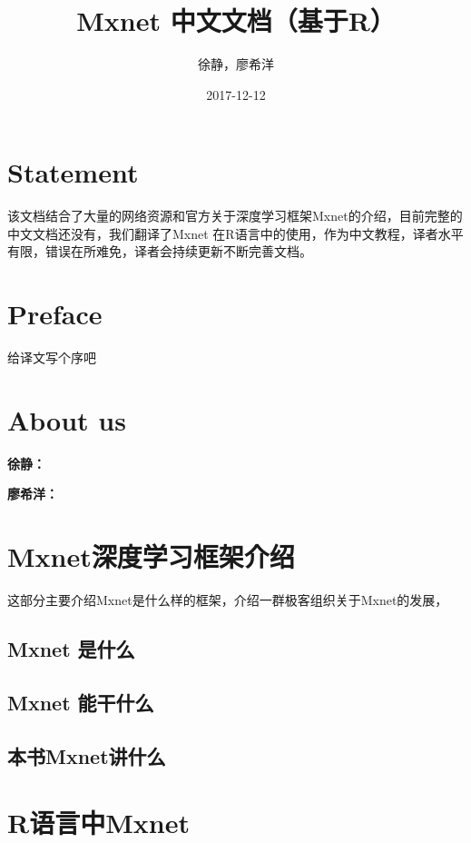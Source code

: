 \documentclass[]{book}
\title{Mxnet 中文文档（基于R）}
\author{徐静，廖希洋}
\date{2017-12-12}
\begin{document}
\maketitle

{
\setcounter{tocdepth}{1}
\tableofcontents
}
\chapter*{Statement}\label{statement}

该文档结合了大量的网络资源和官方关于深度学习框架Mxnet的介绍，目前完整的中文文档还没有，我们翻译了Mxnet
在R语言中的使用，作为中文教程，译者水平有限，错误在所难免，译者会持续更新不断完善文档。

\chapter*{Preface}\label{preface}

给译文写个序吧

\chapter*{About us}\label{about-us}

\textbf{徐静：}

\textbf{廖希洋：}

\chapter{Mxnet深度学习框架介绍}\label{mxnet}

这部分主要介绍Mxnet是什么样的框架，介绍一群极客组织关于Mxnet的发展，

\section{Mxnet 是什么}\label{mxnet-}

\section{Mxnet 能干什么}\label{mxnet-}

\section{本书Mxnet讲什么}\label{mxnet}

\chapter{R语言中Mxnet}\label{rmxnet}
\end{document}
